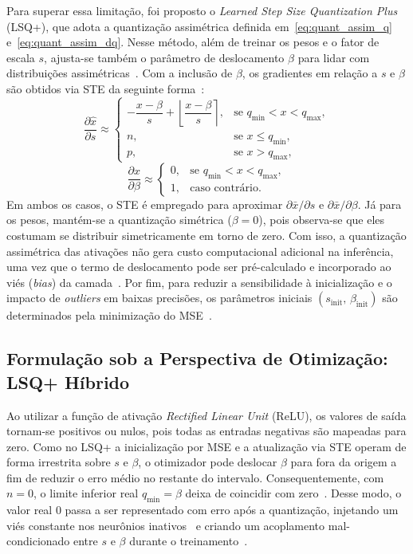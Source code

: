 Para superar essa limitação, foi proposto o \textit{Learned Step Size Quantization Plus} (LSQ+), que adota a quantização assimétrica definida em~\eqref{eq:quant_assim_q}
e~\eqref{eq:quant_assim_dq}. Nesse método, além de treinar os pesos e o fator de escala $s$, ajusta-se também o parâmetro de deslocamento $\beta$ para lidar com distribuições         
assimétricas~\cite{bhalgat2020}. Com a inclusão de $\beta$, os gradientes em relação a $s$ e $\beta$ são obtidos via STE da seguinte forma~\cite{bhalgat2020}:
\begin{equation}
\frac{\partial \hat{x}}{\partial s} \approx
\begin{cases}
-\dfrac{x - \beta}{s} + \left\lfloor \dfrac{x - \beta}{s} \right\rceil, & \text{se } q_{\min} < x < q_{\max}, \\
n, & \text{se } x \le q_{\min}, \\
p, & \text{se } x > q_{\max},
\end{cases}
\label{eq:grad_lsqplus_s}
\end{equation}
\begin{equation}
\frac{\partial \hat{x}}{\partial \beta} \approx
\begin{cases}
0, & \text{se } q_{\min} < x < q_{\max}, \\
1, & \text{caso contrário.}
\end{cases}
\label{eq:grad_lsqplus_beta}
\end{equation}
Em ambos os casos, o STE é empregado para aproximar $\partial \bar{x}/\partial s$ e $\partial \bar{x}/\partial \beta$. Já para os pesos, mantém-se a quantização simétrica ($\beta =   
0$), pois observa-se que eles costumam se distribuir simetricamente em torno de zero. Com isso, a quantização assimétrica das ativações não gera custo computacional adicional na      
inferência, uma vez que o termo de deslocamento pode ser pré-calculado e incorporado ao viés (\textit{bias}) da camada~\cite{bhalgat2020}. Por fim, para reduzir a sensibilidade à     
inicialização e o impacto de \textit{outliers} em baixas precisões, os parâmetros iniciais $(s_{\text{init}},\, \beta_{\text{init}})$ são determinados pela minimização do             
MSE~\cite{bhalgat2020}.

\subsection{Formulação sob a Perspectiva de Otimização: LSQ+ Híbrido}

Ao utilizar a função de ativação \textit{Rectified Linear Unit} (ReLU), os valores de saída tornam-se positivos ou nulos, pois todas as entradas negativas são mapeadas 
para zero. Como no LSQ+ a inicialização por MSE e a atualização via STE operam de forma irrestrita sobre $s$ e $\beta$, o otimizador pode deslocar $\beta$ para fora da origem a fim de
reduzir o erro médio no restante do intervalo. Consequentemente, com $n = 0$, o limite inferior real $q_{\min} = \beta$ deixa de coincidir com zero~\cite{bhalgat2020}. Desse modo, o
valor real $0$ passa a ser representado com erro após a quantização, injetando um viés constante nos neurônios inativos~\cite{nagel2021} e criando um acoplamento mal-condicionado   
entre $s$ e $\beta$ durante o treinamento~\cite{antoniou2007,souza2026}.

